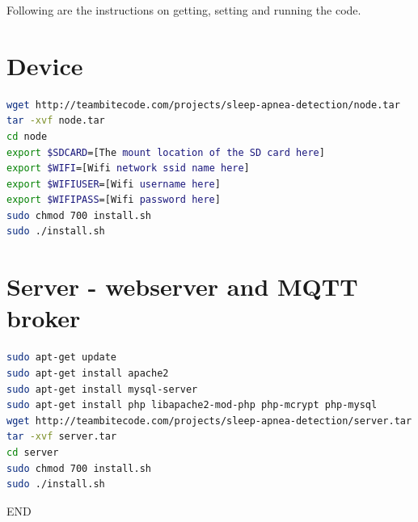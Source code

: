 \documentclass{report}
\begin{document}
Following are the instructions on getting, setting and running the code.\\


\section{Device}
\begin{lstlisting}[language=bash]
wget http://teambitecode.com/projects/sleep-apnea-detection/node.tar
tar -xvf node.tar
cd node
export $SDCARD=[The mount location of the SD card here]
export $WIFI=[Wifi network ssid name here]
export $WIFIUSER=[Wifi username here]
export $WIFIPASS=[Wifi password here]
sudo chmod 700 install.sh
sudo ./install.sh
\end{lstlisting}
\clearpage
\section{Server - webserver and MQTT broker}
\begin{lstlisting}[language=bash]
sudo apt-get update
sudo apt-get install apache2
sudo apt-get install mysql-server
sudo apt-get install php libapache2-mod-php php-mcrypt php-mysql
wget http://teambitecode.com/projects/sleep-apnea-detection/server.tar
tar -xvf server.tar
cd server
sudo chmod 700 install.sh
sudo ./install.sh
\end{lstlisting}
\vspace{8cm}
\LARGE \centering END
\end{document}
